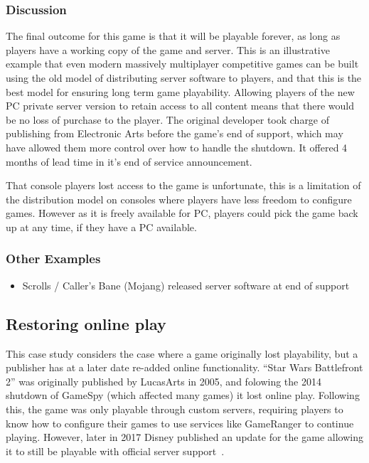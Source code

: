 \subsubsection*{Discussion}
The final outcome for this game is that it will be playable forever, as long as players have a working copy of the game and server.
This is an illustrative example that even modern massively multiplayer competitive games can be built using the old model of distributing server software to players,
and that this is the best model for ensuring long term game playability.
Allowing players of the new PC private server version to retain access to all content means that there would be no loss of purchase to the player.
The original developer took charge of publishing from Electronic Arts before the game's end of support, which may have allowed them more control over how to handle the shutdown.
It offered 4 months of lead time in it's end of service announcement.

That console players lost access to the game is unfortunate, this is a limitation of the distribution model on consoles where players have less freedom to configure games.
However as it is freely available for PC, players could pick the game back up at any time, if they have a PC available.

\subsubsection*{Other Examples}
\begin{itemize}
    \item Scrolls / Caller's Bane (Mojang) released server software at end of support\cite{scrolls-server-2018}
\end{itemize}

\subsection{Restoring online play}
This case study considers the case where a game originally lost playability, but a publisher has at a later date re-added online functionality.
``Star Wars Battlefront 2'' was originally published by LucasArts in 2005,
and folowing the 2014 shutdown of GameSpy (which affected many games) it lost online play.
Following this, the game was only playable through custom servers,
requiring players to know how to configure their games to use services like GameRanger to continue playing.
However, later in 2017 Disney published an update for the game allowing it to still be playable with official server support~\cite{disney-swbf2-2017}.

